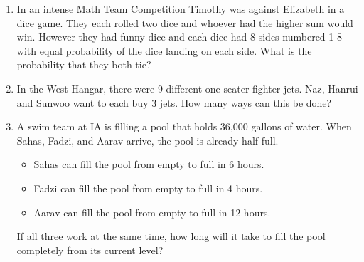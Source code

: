 \documentclass[a4paper]{article}
\begin{document}
\begin{enumerate}[itemsep=4cm]
    \item In an intense Math Team Competition Timothy was against Elizabeth in a dice game. They each rolled two dice and whoever had the higher sum would win. However they had funny dice and each dice had 8 sides numbered 1-8 with equal probability of the dice landing on each side. What is the probability that they both tie?
    \item In the West Hangar, there were 9 different one seater fighter jets. Naz, Hanrui and Sunwoo want to each buy 3 jets. How many ways can this be done? 
    \item A swim team at IA is filling a pool that holds 36,000 gallons of water. When Sahas, Fadzi, and Aarav arrive, the pool is already half full.
    \begin{itemize}
        \item Sahas can fill the pool from empty to full in 6 hours.
        \item Fadzi can fill the pool from empty to full in 4 hours.
        \item Aarav can fill the pool from empty to full in 12 hours.
    \end{itemize}
    If all three work at the same time, how long will it take to fill the pool completely from its current level?


\end{enumerate}
\end{document}
